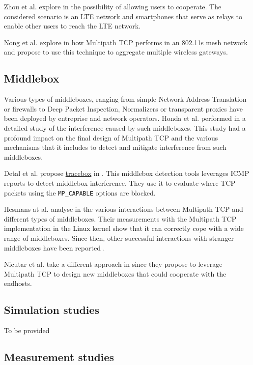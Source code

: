 Zhou et al. explore in \cite{Zhou_cooperation:2015} the possibility of allowing users to cooperate. The considered scenario is an LTE network and smartphones that serve as relays to enable other users to reach the LTE network.

Nong et al. explore in \cite{Nong_Aggregating:2014} how Multipath TCP performs in an 802.11s mesh network and propose to use this technique to aggregate multiple wireless gateways.

\subsection{Middlebox}

Various types of middleboxes, ranging from simple Network Address Translation or firewalls to Deep Packet Inspection, Normalizers or transparent proxies have been deployed by entreprise and network operators. Honda et al. performed in \cite{Honda_Extend:2011} a detailed study of the interference caused by such middleboxes. This study had a profound impact on the final design of Multipath TCP and the various mechanisms that it includes to detect and mitigate interference from such middleboxes.

Detal et al. propose \href{http://tracebox.org}{tracebox} in \cite{Detal_tracebox:2013}. This middlebox detection tools leverages ICMP reports to detect middlebox interference. They use it to evaluate where TCP packets using the \texttt{MP\_CAPABLE} options are blocked.

Hesmans at al. analyse in \cite{Hesmans_Extensions:2013} the various interactions between Multipath TCP and different types of middleboxes. Their measurements with the Multipath TCP implementation in the Linux kernel show that it can correctly cope with a wide range of middleboxes. Since then, other successful interactions with stranger middleboxes have been reported \cite{draft-ietf-mptcp-experience}.

Nicutar et al. take a different approach in \cite{Nicutar_Acrobatics:2013} since they propose to leverage Multipath TCP to design new middleboxes that could cooperate with the endhosts.

\subsection{Simulation studies}

To be provided

\subsection{Measurement studies}


